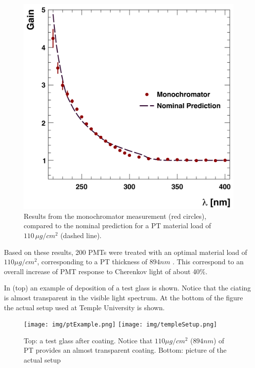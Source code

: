 \begin{figure}
	\centering
	\includegraphics[width=0.95\columnwidth,keepaspectratio]{img/ptQEResults.png}
	\caption{Results from the monochromator measurement (red circles), compared to the
				nominal prediction for a PT material load of
            $110\,\mu g/cm^2$ (dashed line).}
	\label{fig:ptQEResults}
\end{figure}

Based on these results, 200 PMTs were treated with an optimal material load of $110 \mu g/ cm^2$,
corresponding to a PT thickness of $894 nm$ \cite{Joosten:2016lcl}. This correspond to an overall
increase of PMT response to Cherenkov light of about 40\%.

In  (top) an example of deposition of a test glass is shown. Notice that the ciating is almost
transparent in the visible light spectrum. At the bottom of the figure the actual setup used at Temple
University is shown.

\begin{figure}
	\centering
	\texttt{[image: img/ptExample.png]}
	\texttt{[image: img/templeSetup.png]}
\caption{Top: a test glass after coating. Notice that  $110 \mu g/ cm^2$ ($894 nm$) of PT provides an
almost transparent coating. Bottom: picture of the actual setup}
	\label{fig:ptExample}
\end{figure}




